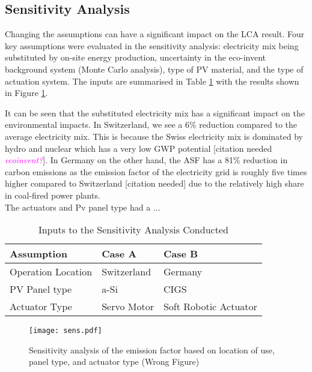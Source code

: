 \subsection{Sensitivity Analysis}

Changing the assumptions can have a significant impact on the LCA result. Four key assumptions were evaluated in the sensitivity analysis: electricity mix being substituted by on-site energy production, uncertainty in the eco-invent background system (Monte Carlo analysis), type of PV material, and the type of actuation system. The inputs are summarised in Table \ref{tab:sens} with the results shown in Figure \ref{fig:sens}. 

It can be seen that the substituted electricity mix has a significant impact on the environmental impacts. In Switzerland, we see a 6\% reduction compared to the average electricity mix. This is because the Swiss electricity mix is dominated by hydro and nuclear which has a very low GWP potential [citation needed\textcolor{magenta}{ \textit{ecoinvent?}}]. In Germany on the other hand, the ASF has a 81\% reduction in carbon emissions as the emission factor of the electricity grid is roughly five times higher compared to Switzerland [citation needed] due to the relatively high share in coal-fired power plants.\\

The actuators and Pv panel type had a ...



\begin{table}
\centering
\begin{tabular}{lll}
Assumption & Case A & Case B \\
\hline
Operation Location  & Switzerland & Germany \\
PV Panel type  & a-Si        & CIGS    \\
Actuator Type           & Servo Motor       & Soft Robotic Actuator   \\
\end{tabular}
\caption{Inputs to the Sensitivity Analysis Conducted}
\label{tab:sens}
\end{table}

\begin{figure}[H]
\begin{center}
\texttt{[image: sens.pdf]}
\caption{Sensitivity analysis of the emission factor based on location of use, panel type, and actuator type (Wrong Figure)}
\label{fig:sens}
\end{center}
\end{figure}



